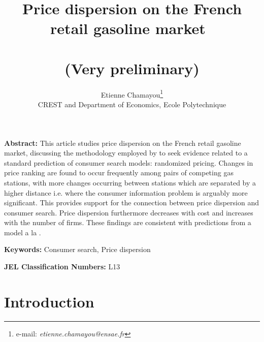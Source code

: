 \documentclass[11pt]{article}
\begin{document}
\title{Price dispersion on the French retail gasoline market\ \\ \ \\(Very preliminary)}
\author{Etienne Chamayou\thanks{e-mail:
\textit{etienne.chamayou@ensae.fr}}\medskip\\{\normalsize CREST and Department of Economics, Ecole Polytechnique }}
\maketitle

\sloppy%

\onehalfspacing

\textbf{Abstract:}
This article studies price dispersion on the French retail gasoline market, discussing the methodology employed by \cite{TAP11} to seek evidence related to a standard prediction of consumer search models: randomized pricing. Changes in price ranking are found to occur frequently among pairs of competing gas stations, with more changes occurring between stations which are separated by a higher distance i.e. where the consumer information problem is arguably more significant. This provides support for the connection between price dispersion and consumer search. Price dispersion furthermore decreases with cost and increases with the number of firms. These findings are consistent with predictions from a model a la \cite{VAR80}.

\strut

\textbf{Keywords:} Consumer search, Price dispersion

\strut

\textbf{JEL Classification Numbers:} L13

\pagebreak%
\doublespacing

\section{Introduction}
\setcounter{page}{1}
\end{document}
